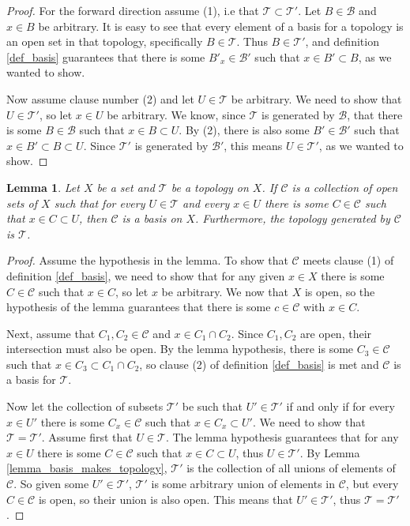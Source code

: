 \documentclass{report}
\newtheorem{lemma}{Lemma}[section]
\theoremstyle{definition}
\theoremstyle{remark}
\newcommand{\prt}[1]{\mathcal{#1}}
\begin{document}
\begin{proof}
    For the forward direction assume (1), i.e that $\prt{T} \subset \prt{T'}$. Let $B \in \prt{B}$ and $x \in B$ be arbitrary. It is easy to see that every element of a basis for a topology is an open set in that topology, specifically $B \in \prt{T}$. Thus $B \in \prt{T'}$, and definition \ref{def_basis} guarantees that there is some $B'_x \in \prt{B'}$ such that $x \in B' \subset B$, as we wanted to show.
    
    Now assume clause number (2) and let $U \in \prt{T}$ be arbitrary. We need to show that $U \in \prt{T'}$, so let $x \in U$ be arbitrary. We know, since $\prt{T}$ is generated by $\prt{B}$, that there is some $B \in \prt{B}$ such that $x \in B \subset U$. By (2), there is also some $B' \in \prt{B'}$ such that $x \in B' \subset B \subset U$. Since $\prt{T'}$ is generated by $\prt{B'}$, this means $U \in \prt{T'}$, as we wanted to show.
\end{proof}


\begin{lemma} \label{lemma_collection_is_basis}
    Let $X$ be a set and $\prt{T}$ be a topology on $X$. If $\prt{C}$ is a collection of open sets of $X$ such that for every $U \in \prt{T}$ and every $x \in U$ there is some $C \in \prt{C}$ such that $x \in C \subset U$, then $\prt{C}$ is a basis on $X$. Furthermore, the topology generated by $\prt{C}$ is $\prt{T}$.
\end{lemma}

\begin{proof}
    Assume the hypothesis in the lemma. To show that $\prt{C}$ meets clause (1) of definition \ref{def_basis}, we need to show that for any given $x \in X$ there is some $C \in \prt{C}$ such that $x \in C$, so let $x$ be arbitrary. We now that $X$ is open, so the hypothesis of the lemma guarantees that there is some $c \in \prt{C}$ with $x \in C$.
    
    Next, assume that $C_1, C_2 \in \prt{C}$ and $x \in C_1 \cap C_2$. Since $C_1, C_2$ are open, their intersection must also be open. By the lemma hypothesis, there is some $C_3 \in \prt{C}$ such that $x \in C_3 \subset C_1 \cap C_2$, so clause (2) of definition \ref{def_basis} is met and $\prt{C}$ is a basis for $\prt{T}$.
    
    Now let the collection of subsets $\prt{T'}$ be such that $U' \in \prt{T'}$ if and only if for every $x \in U'$ there is some $C_x \in \prt{C}$ such that $x \in C_x \subset U'$. We need to show that $\prt{T} = \prt{T'}$. Assume first that $U \in \prt{T}$. The lemma hypothesis guarantees that for any $x \in U$ there is some $C \in \prt{C}$ such that $x \in C \subset U$, thus $U \in \prt{T'}$. By Lemma \ref{lemma_basis_makes_topology}, $\prt{T'}$ is the collection of all unions of elements of $\prt{C}$. So given some $U' \in \prt{T'}$, $\prt{T'}$ is some arbitrary union of elements in $\prt{C}$, but every $C \in \prt{C}$ is open, so their union is also open. This means that $U' \in \prt{T'}$, thus $\prt{T} = \prt{T'}$.
\end{proof}
\end{document}
